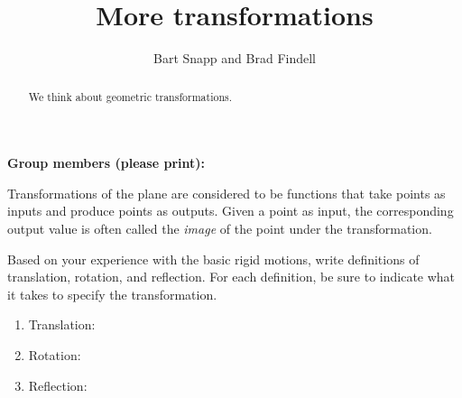 \documentclass[nooutcomes,noauthor]{ximera}
\title{More transformations}
\author{Bart Snapp and Brad Findell}
\begin{document}
\begin{abstract}
  We think about geometric transformations.
\end{abstract}
\maketitle

\noindent\textbf{Group members (please print):}\ \hrulefill \\

\hrulefill


Transformations of the plane are considered to be functions that take points as inputs and produce 
points as outputs.  Given a point as input, the corresponding output value is often called 
the \emph{image} of the point under the transformation.%
\begin{problem}
Based on your experience with the basic rigid motions, write definitions of translation, rotation, and reflection.%
  For each definition, be sure to indicate what it
  takes to specify the transformation.
\begin{enumerate}
\item Translation: 
\vspace{0.3in}
\item Rotation: 
\vspace{0.3in}
\item Reflection: 
\vspace{0.3in}
\end{enumerate}
\end{problem}
\end{document}
